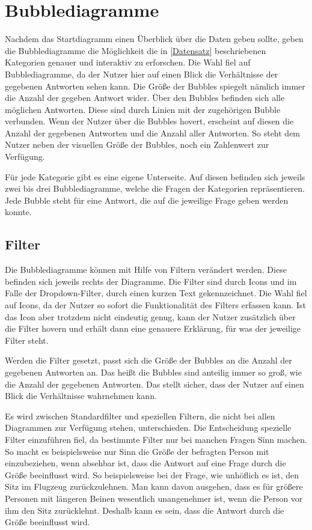 \documentclass{mi-seminar}
\begin{document}
\section{Bubblediagramme}
Nachdem das Startdiagramm einen Überblick über die Daten geben sollte, geben die Bubblediagramme die Möglichkeit die in \ref{Datensatz} beschriebenen Kategorien genauer und interaktiv zu erforschen.
Die Wahl fiel auf Bubblediagramme, da der Nutzer hier auf einen Blick die Verhältnisse der gegebenen Antworten sehen kann. Die Größe der Bubbles spiegelt nämlich immer die Anzahl der gegeben Antwort wider. Über den Bubbles befinden sich alle möglichen Antworten. Diese sind durch Linien mit der zugehörigen Bubble verbunden. Wenn der Nutzer über die Bubbles hovert, erscheint auf diesen die Anzahl der gegebenen Antworten und die Anzahl aller Antworten. So steht dem Nutzer neben der visuellen Größe der Bubbles, noch ein Zahlenwert zur Verfügung. 

Für jede Kategorie gibt es eine eigene Unterseite. Auf diesen befinden sich jeweils zwei bis drei Bubblediagramme, welche die Fragen der Kategorien repräsentieren. Jede Bubble steht für eine Antwort, die auf die jeweilige Frage geben werden konnte. 

\subsection{Filter}
Die Bubblediagramme können mit Hilfe von Filtern verändert werden. Diese befinden sich jeweils rechts der Diagramme. Die Filter sind durch Icons und im Falle der Dropdown-Filter, durch einen kurzen Text gekennzeichnet. Die Wahl fiel auf Icons, da der Nutzer so sofort die Funktionalität des Filters erfassen kann. Ist das Icon aber trotzdem nicht eindeutig genug, kann der Nutzer zusätzlich über die Filter hovern und erhält dann eine genauere Erklärung, für was der jeweilige Filter steht. 

Werden die Filter gesetzt, passt sich die Größe der Bubbles an die Anzahl der gegebenen Antworten an. Das heißt die Bubbles sind anteilig immer so groß, wie die Anzahl der gegebenen Antworten. Das stellt sicher, dass der Nutzer auf einen Blick die Verhältnisse wahrnehmen kann.  

Es wird zwischen Standardfilter und speziellen Filtern, die nicht bei allen Diagrammen zur Verfügung stehen, unterschieden. Die Entscheidung spezielle Filter einzuführen fiel, da bestimmte Filter nur bei manchen Fragen Sinn machen. So macht es beispielsweise nur Sinn die Größe der befragten Person mit einzubeziehen, wenn absehbar ist, dass die Antwort auf eine Frage durch die Größe beeinflusst wird. So beispielsweise bei der Frage, wie unhöflich es ist, den Sitz im Flugzeug zurückzulehnen. Man kann davon ausgehen, dass es für größere Personen mit längeren Beinen wesentlich unangenehmer ist, wenn die Person vor ihm den Sitz zurücklehnt. Deshalb kann es sein, dass die Antwort durch die Größe beeinflusst wird.
\end{document}
